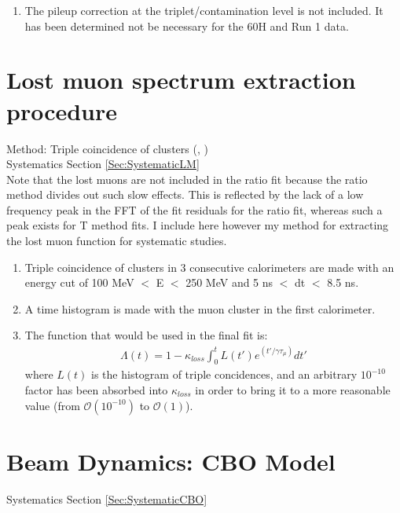 \begin{enumerate}
		\item{The pileup correction at the triplet/contamination level is not included. It has been determined not be necessary for the 60H and Run 1 data.}
	\end{enumerate}


\section{Lost muon spectrum extraction procedure}
\label{Sec:LM}

	Method: Triple coincidence of clusters (, \cite{MuonLosses}) \\
	\noindent Systematics Section \ref{Sec:SystematicLM} \\

	Note that the lost muons are not included in the ratio fit because the ratio method divides out such slow effects. This is reflected by the lack of a low frequency peak in the FFT of the fit residuals for the ratio fit, whereas such a peak exists for T method fits. I include here however my method for extracting the lost muon function for systematic studies.

	\begin{enumerate}
		\item{Triple coincidence of clusters in 3 consecutive calorimeters are made with an energy cut of 100 MeV $<$ E $<$ 250 MeV and 5 ns $<$ dt $<$ 8.5 ns.}
		\item{A time histogram is made with the muon cluster in the first calorimeter.}
		\item{The function that would be used in the final fit is:
			\begin{gather}
				\Lambda(t) = 1 - \kappa_{loss} \int_{0}^{t} L(t')e^{(t'/\gamma\tau_{\mu})} dt'
			\end{gather}
		where $L(t)$ is the histogram of triple concidences, and an arbitrary $10^{-10}$ factor has been absorbed into $\kappa_{loss}$ in order to bring it to a more reasonable value (from $\mathcal{O}(10^{-10})$ to $\mathcal{O}(1)$).}
	\end{enumerate}


\section{Beam Dynamics: CBO Model}
\label{Sec:CBO}

	\noindent Systematics Section \ref{Sec:SystematicCBO}

